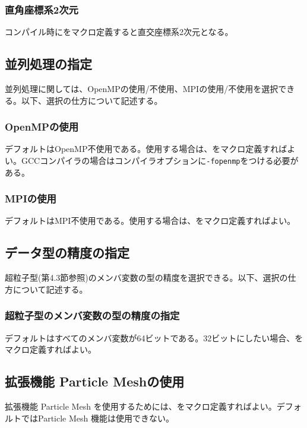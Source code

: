 \subsubsection{直角座標系2次元}
コンパイル時にをマクロ定義すると直交座標系2次元となる。

\subsection{並列処理の指定}
\label{subsec:macro_parallel}
並列処理に関しては、OpenMPの使用/不使用、MPIの使用/不使用を選択できる。以下、選択の仕方について記述する。

\subsubsection{OpenMPの使用}
デフォルトはOpenMP不使用である。使用する場合は、をマクロ定義すればよい。GCCコンパイラの場合はコンパイラオプションに\texttt{-fopenmp}をつける必要がある。

\subsubsection{MPIの使用}
デフォルトはMPI不使用である。使用する場合は、をマクロ定義すればよい。

\subsection{データ型の精度の指定}
\label{subsec:macro_FP_accuracy}
超粒子型(第4.3節参照)のメンバ変数の型の精度を選択できる。以下、選択の仕方について記述する。

\subsubsection{超粒子型のメンバ変数の型の精度の指定}
デフォルトはすべてのメンバ変数が64ビットである。32ビットにしたい場合、をマクロ定義すればよい。

\subsection{拡張機能 Particle Meshの使用}
\label{subsec:macro_PM}
拡張機能 Particle Mesh を使用するためには、をマクロ定義すればよい。デフォルトではParticle Mesh 機能は使用できない。


